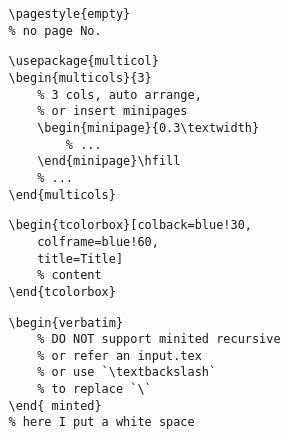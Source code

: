 \documentclass{article}
\begin{document}
\begin{multicols}{2}
\begin{minipage}{0.45\textwidth}
\begin{tcolorbox}[colback=orange!30, colframe=orange!60, title=Document]
\begin{verbatim}
                \pagestyle{empty} 
                % no page No.
            \end{verbatim}
        \end{tcolorbox}
        \begin{tcolorbox}[colback=cyan!30, colframe=cyan!60, title=Multi-columns]
            \begin{verbatim}
                \usepackage{multicol}        
                \begin{multicols}{3}
                    % 3 cols, auto arrange, 
                    % or insert minipages  
                    \begin{minipage}{0.3\textwidth}  
                        % ...
                    \end{minipage}\hfill
                    % ...
                \end{multicols}                
            \end{verbatim}
        \end{tcolorbox}
    \end{minipage}\hfill
    \begin{minipage}{0.45\textwidth}
        \begin{tcolorbox}[colback=cyan!30, colframe=cyan!60, title=Colorful-text-box]
            \begin{verbatim}
                \begin{tcolorbox}[colback=blue!30, 
                    colframe=blue!60, 
                    title=Title]
                    % content
                \end{tcolorbox}
        \end{verbatim}
        \end{tcolorbox}
        \begin{tcolorbox}[colback=violet!30, colframe=violet!60, title=Code-block]
            \begin{verbatim}
                \begin{verbatim}
                    % DO NOT support minited recursive
                    % or refer an input.tex  
                    % or use `\textbackslash`
                    % to replace `\`
                \end{ minted}  
                % here I put a white space 
            \end{verbatim}
        \end{tcolorbox}
        \begin{tcolorbox}[colback=orange!30, colframe=orange!60, title=Custom-color]

\end{tcolorbox}
\end{minipage}
\end{multicols}
\end{document}
